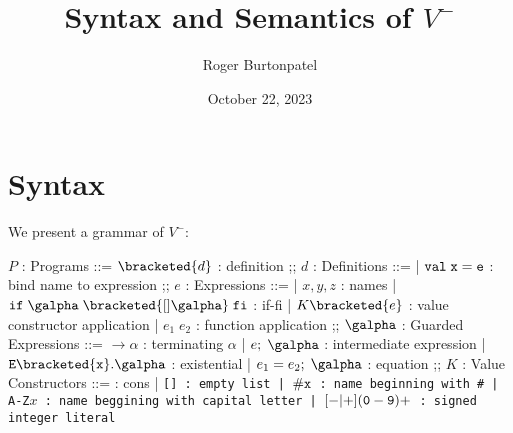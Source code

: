 \documentclass[]{article}
\title{Syntax and Semantics of $V^{-}$}
\author{Roger Burtonpatel}
\date{October 22, 2023}
\begin{document}
\maketitle

\section{Syntax}

We present a grammar of $V^{-}$: 

\bigskip



\begin{center}
    \begin{bnf}
    $P$ : \textsf{Programs} ::=
    $\bracketed{d}$ : definition
    ;;
    $d$ : \textsf{Definitions} ::=
    | $\tt{val} \; x \; \tt{=} \; e$ : bind name to expression
    ;;
    $e$ : \textsf{Expressions} ::=
    | $x, y, z$ : names
    | $\tt{if} \; \galpha \; \bracketed{[] \galpha} \; \tt{fi}$ : if-fi 
    | $K \bracketed{e}$ : value constructor application 
    | $e_1 \; e_2$ : function application 
    ;;
    $\galpha$ : \textsf{Guarded Expressions} ::=  
    $\boldsymbol{\rightarrow}\alpha$ : terminating $\alpha$ 
    | $e; \; \galpha$ : intermediate expression 
    | $\tt{E} \bracketed{x} \tt{.} \galpha$ : existential 
    | $e_1 = e_2; \; \galpha$ : equation 
    ;;
    $K$ : \textsf{Value Constructors} ::=
    \cons : cons 
    | \tt{[]} : empty list 
    | $\tt{\#}x$ : name beginning with \tt{\#}
    | \tt{A-Z}$x$ : name beggining with capital letter
    | $[\tt{-}\vert\tt{+}](\tt{0}-\tt{9})+$ : signed integer literal 

    \end{bnf}
\end{center}
\end{document}
